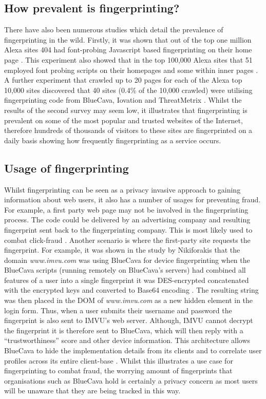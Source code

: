 \documentclass{article}
\begin{document}
\subsection{How prevalent is fingerprinting?}
There have also been numerous studies which detail the prevalence of fingerprinting in the wild. Firstly, it was shown that out of the top one million Alexa sites 404 had font-probing Javascript based fingerprinting on their home page \parencite{dustingFP}. This experiment also showed that in the top 100,000 Alexa sites that 51 employed font probing scripts on their homepages and some within inner pages \parencite{dustingFP}. A further experiment that crawled up to 20 pages for each of the Alexa top 10,000 sites discovered that 40 sites (0.4\% of the 10,000 crawled) were utilising fingerprinting code from BlueCava, Iovation and ThreatMetrix \parencite{cookielessMonster}. Whilst the results of the second survey may seem low, it illustrates that fingerprinting is prevalent on some of the most popular and trusted websites of the Internet, therefore hundreds of thousands of visitors to these sites are fingerprinted on a daily basis \parencite{cookielessMonster} showing how frequently fingerprinting as a service occurs.  \\ 

\subsection{Usage of fingerprinting}
Whilst fingerprinting can be seen as a privacy invasive approach to gaining information about web users, it also has a number of usages for preventing fraud. For example, a first party web page may not be involved in the fingerprinting process. The code could be delivered by an advertising company and resulting fingerprint sent back to the fingerprinting company. This is most likely used to combat click-fraud \parencite{cookielessMonster}. Another scenario is where the first-party site requests the fingerprint. For example, it was shown in the study by Nikiforakis that the domain \textit{www.imvu.com} was using BlueCava for device fingerprinting when the BlueCava scripts (running remotely on BlueCava's servers) had combined all features of a user into a single fingerprint it was DES-encrypted concatenated with the encrypted keys and converted to Base64 encoding \parencite{cookielessMonster}. The resulting string was then placed in the DOM of \textit{www.imvu.com} as a new hidden element in the login form. Thus, when a user submits their username and password the fingerprint is also sent to IMVU's web server. Although, IMVU cannot decrypt the fingerprint it is therefore sent to BlueCava, which will then reply with a “trustworthiness” score and other device information. This architecture allows BlueCava to hide the implementation details from its clients and to correlate user profiles across its entire client-base \parencite{cookielessMonster}. Whilst this illustrates a use case for fingerprinting to combat fraud, the worrying amount of fingerprints that organisations such as BlueCava hold is certainly a privacy concern as most users will be unaware that they are being tracked in this way.  \\ 
\end{document}
